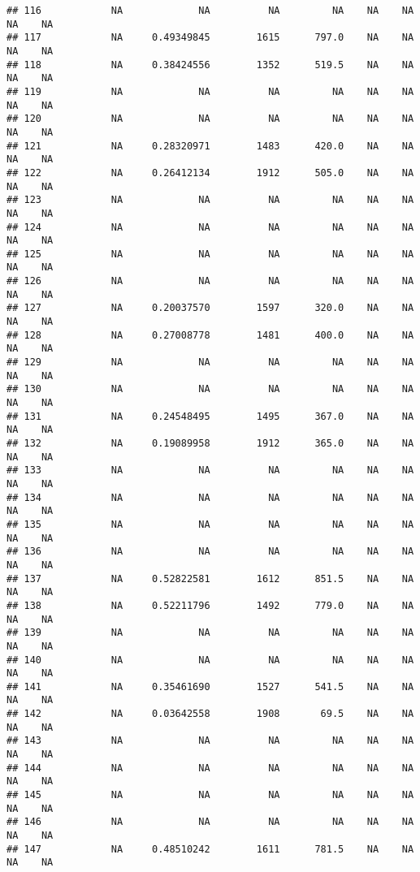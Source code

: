 \documentclass[]{article}
\begin{document}
\begin{verbatim}
## 116            NA             NA          NA         NA    NA    NA    NA    NA
## 117            NA     0.49349845        1615      797.0    NA    NA    NA    NA
## 118            NA     0.38424556        1352      519.5    NA    NA    NA    NA
## 119            NA             NA          NA         NA    NA    NA    NA    NA
## 120            NA             NA          NA         NA    NA    NA    NA    NA
## 121            NA     0.28320971        1483      420.0    NA    NA    NA    NA
## 122            NA     0.26412134        1912      505.0    NA    NA    NA    NA
## 123            NA             NA          NA         NA    NA    NA    NA    NA
## 124            NA             NA          NA         NA    NA    NA    NA    NA
## 125            NA             NA          NA         NA    NA    NA    NA    NA
## 126            NA             NA          NA         NA    NA    NA    NA    NA
## 127            NA     0.20037570        1597      320.0    NA    NA    NA    NA
## 128            NA     0.27008778        1481      400.0    NA    NA    NA    NA
## 129            NA             NA          NA         NA    NA    NA    NA    NA
## 130            NA             NA          NA         NA    NA    NA    NA    NA
## 131            NA     0.24548495        1495      367.0    NA    NA    NA    NA
## 132            NA     0.19089958        1912      365.0    NA    NA    NA    NA
## 133            NA             NA          NA         NA    NA    NA    NA    NA
## 134            NA             NA          NA         NA    NA    NA    NA    NA
## 135            NA             NA          NA         NA    NA    NA    NA    NA
## 136            NA             NA          NA         NA    NA    NA    NA    NA
## 137            NA     0.52822581        1612      851.5    NA    NA    NA    NA
## 138            NA     0.52211796        1492      779.0    NA    NA    NA    NA
## 139            NA             NA          NA         NA    NA    NA    NA    NA
## 140            NA             NA          NA         NA    NA    NA    NA    NA
## 141            NA     0.35461690        1527      541.5    NA    NA    NA    NA
## 142            NA     0.03642558        1908       69.5    NA    NA    NA    NA
## 143            NA             NA          NA         NA    NA    NA    NA    NA
## 144            NA             NA          NA         NA    NA    NA    NA    NA
## 145            NA             NA          NA         NA    NA    NA    NA    NA
## 146            NA             NA          NA         NA    NA    NA    NA    NA
## 147            NA     0.48510242        1611      781.5    NA    NA    NA    NA

\end{verbatim}
\end{document}
